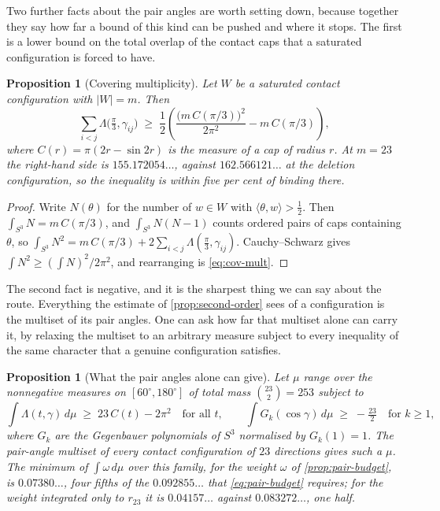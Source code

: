 \documentclass[11pt,reqno]{amsart}
\renewcommand{\_}{\origunderscore\allowbreak}
\numberwithin{equation}{section}
\theoremstyle{plain}
\newtheorem{prop}[thm]{Proposition}
\theoremstyle{definition}
\theoremstyle{remark}
\begin{document}
Two further facts about the pair angles are worth setting down, because
together they say how far a bound of this kind can be pushed and where it
stops. The first is a lower bound on the total overlap of the contact caps
that a saturated configuration is forced to have.

\begin{prop}[Covering multiplicity]\label{prop:cov-mult}
Let $W$ be a saturated contact configuration with $|W|=m$. Then
\begin{equation}\label{eq:cov-mult}
  \sum_{i<j}\Lambda\bigl(\tfrac\pi3,\gamma_{ij}\bigr)
  \;\ge\;\frac12\left(\frac{\bigl(m\,C(\pi/3)\bigr)^2}{2\pi^2}
    -m\,C(\pi/3)\right),
\end{equation}
where $C(r)=\pi(2r-\sin2r)$ is the measure of a cap of radius $r$. At
$m=23$ the right-hand side is $155.172054\ldots$, against
$162.566121\ldots$ at the deletion configuration, so the inequality is
within five per cent of binding there.
\end{prop}

\begin{proof}
Write $N(\theta)$ for the number of $w\in W$ with
$\langle\theta,w\rangle>\tfrac12$. Then $\int_{S^3}N=m\,C(\pi/3)$, and
$\int_{S^3}N(N-1)$ counts ordered pairs of caps containing $\theta$, so
$\int_{S^3}N^2=m\,C(\pi/3)+2\sum_{i<j}\Lambda(\tfrac\pi3,\gamma_{ij})$.
Cauchy--Schwarz gives $\int N^2\ge(\int N)^2/2\pi^2$, and rearranging is
\eqref{eq:cov-mult}.
\end{proof}

The second fact is negative, and it is the sharpest thing we can say
about the route. Everything the estimate of \cref{prop:second-order} sees
of a configuration is the multiset of its pair angles. One can ask how
far that multiset alone can carry it, by relaxing the multiset to an
arbitrary measure subject to every inequality of the same character that
a genuine configuration satisfies.

\begin{prop}[What the pair angles alone can give]\label{prop:two-point-barrier}
Let $\mu$ range over the nonnegative measures on $[60^\circ,180^\circ]$
of total mass $\binom{23}2=253$ subject to
\[
  \int\Lambda(t,\gamma)\,d\mu\;\ge\;23\,C(t)-2\pi^2
  \quad\text{for all } t,
  \qquad
  \int G_k(\cos\gamma)\,d\mu\;\ge\;-\tfrac{23}2
  \quad\text{for }k\ge1,
\]
where $G_k$ are the Gegenbauer polynomials of $S^3$ normalised by
$G_k(1)=1$. The pair-angle multiset of every contact configuration of
$23$ directions gives such a $\mu$. The minimum of $\int\omega\,d\mu$
over this family, for the weight $\omega$ of \cref{prop:pair-budget},
is $0.07380\ldots$, four fifths of the $0.092855\ldots$ that
\eqref{eq:pair-budget} requires; for the weight integrated only to
$r_{23}$ it is $0.04157\ldots$ against $0.083272\ldots$, one half.
\end{prop}
\end{document}
